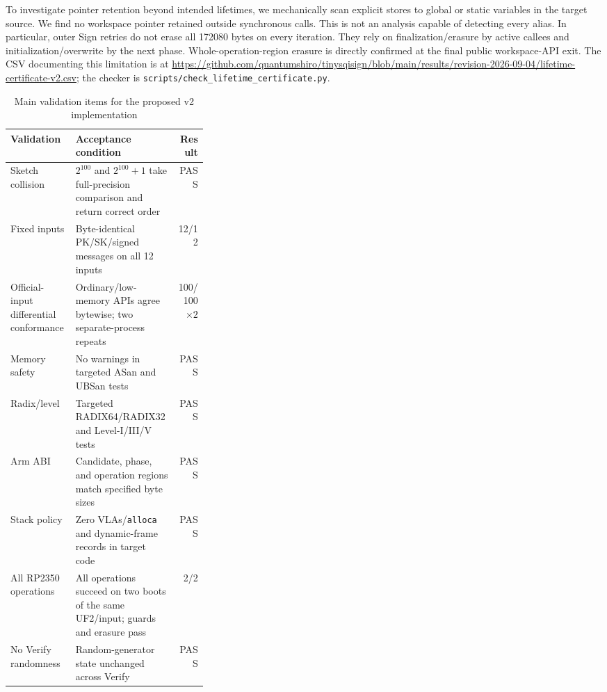\documentclass[a4paper,10pt]{article}
\theoremstyle{definition}
\theoremstyle{remark}
\begin{document}
To investigate pointer retention beyond intended lifetimes, we mechanically scan explicit stores to global or static variables in the target source. We find no workspace pointer retained outside synchronous calls. This is not an analysis capable of detecting every alias. In particular, outer Sign retries do not erase all \num{172080} bytes on every iteration. They rely on finalization/erasure by active callees and initialization/overwrite by the next phase. Whole-operation-region erasure is directly confirmed at the final public workspace-API exit. The CSV documenting this limitation is at \url{https://github.com/quantumshiro/tinysqisign/blob/main/results/revision-2026-09-04/lifetime-certificate-v2.csv}; the checker is \texttt{scripts/check\_lifetime\_certificate.py}.

\begin{table}[H]
  \centering
  \caption{Main validation items for the proposed v2 implementation}
  \label{tab:correctness-gates}
  \small
  \begin{tabularx}{\linewidth}{@{}p{0.33\linewidth}Xr@{}}
    \toprule
    Validation & Acceptance condition & Result \\
    \midrule
    Sketch collision & $2^{100}$ and $2^{100}+1$ take full-precision comparison and return correct order & PASS \\
    Fixed inputs & Byte-identical PK/SK/signed messages on all 12 inputs & 12/12 \\
    Official-input differential conformance & Ordinary/low-memory APIs agree bytewise; two separate-process repeats & 100/100 $\times 2$ \\
    Memory safety & No warnings in targeted ASan and UBSan tests & PASS \\
    Radix/level & Targeted RADIX64/RADIX32 and Level-I/III/V tests & PASS \\
    Arm ABI & Candidate, phase, and operation regions match specified byte sizes & PASS \\
    Stack policy & Zero VLAs/\texttt{alloca} and dynamic-frame records in target code & PASS \\
    All RP2350 operations & All operations succeed on two boots of the same UF2/input; guards and erasure pass & 2/2 \\
    No Verify randomness & Random-generator state unchanged across Verify & PASS \\
    \bottomrule
  \end{tabularx}
\end{table}
\end{document}
